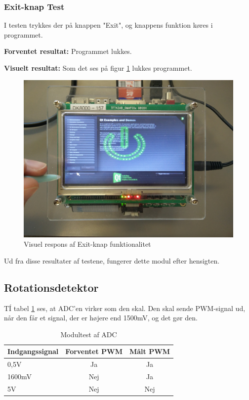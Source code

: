 \subsubsection{Exit-knap Test}
I testen trykkes der på knappen "Exit", og knappens funktion køres i programmet.\newline

\noindent\textbf{Forventet resultat:}\newline
\noindent Programmet lukkes.\newline

\noindent\textbf{Visuelt resultat:}\newline
Som det ses på figur \ref{fig:GUIExit} lukkes programmet.

\begin{figure}[H]
	\centering
	\includegraphics[width=.5\textwidth]{Test/images/GUITest/TestExit.jpg}
	\caption{Visuel respons af Exit-knap funktionalitet}
	\label{fig:GUIExit}
\end{figure}

Ud fra disse resultater af testene, fungerer dette modul efter hensigten.

\subsection{Rotationsdetektor}
TÍ tabel \ref{table:ADC_affyring_test} ses, at ADC'en virker som den skal. Den skal sende PWM-signal ud, når den får et signal, der er højere end 1500mV, og det gør den. 

\begin{table}[H]
	\centering
	\begin{tabular}{|l|c|c|}
		\hline
		\textbf{Indgangssignal} & \textbf{Forventet PWM}	& \textbf{Målt PWM} \\ \hline
		0,5V					& Ja                     	& Ja                \\ \hline
		1600mV					& Nej                    	& Ja                \\ \hline
		5V 						& Nej						& Nej                \\ \hline
	\end{tabular}
	\caption{Modultest af ADC}
	\label{table:ADC_affyring_test}
\end{table}

